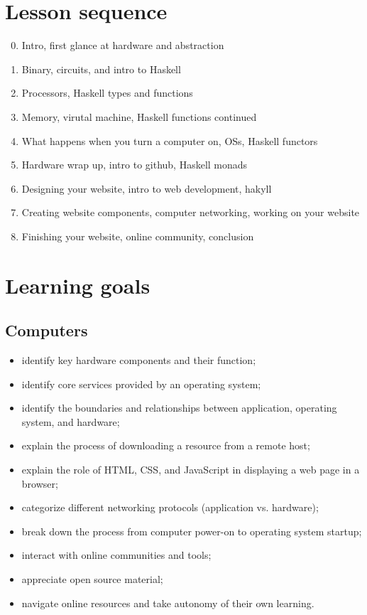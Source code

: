 \documentclass[11pt]{article}
\begin{document}
\vfill
\section*{Lesson sequence}

\begin{enumerate}
    \setcounter{enumi}{-1}
  \item Intro, first glance at hardware and abstraction
  \item Binary, circuits, and intro to Haskell
  \item Processors, Haskell types and functions
  \item Memory, virutal machine, Haskell functions continued
  \item What happens when you turn a computer on, OSs, Haskell functors
  \item Hardware wrap up, intro to github, Haskell monads
  \item Designing your website, intro to web development, hakyll
  \item Creating website components, computer networking, working on your
    website
  \item Finishing your website, online community, conclusion
\end{enumerate}

\section*{Learning goals}

\subsection*{Computers}

\begin{itemize}
  \item identify key hardware components and their function;
  \item identify core services provided by an operating system;
  \item identify the boundaries and relationships between application,
    operating system, and hardware;
  \item explain the process of downloading a resource from a remote host;
  \item explain the role of HTML, CSS, and JavaScript in displaying a web page
    in a browser;
  \item categorize different networking protocols (application vs. hardware);
  \item break down the process from computer power-on to operating system
    startup;
  \item interact with online communities and tools;
  \item appreciate open source material;
  \item navigate online resources and take autonomy of their own learning.
\end{itemize}
\end{document}
